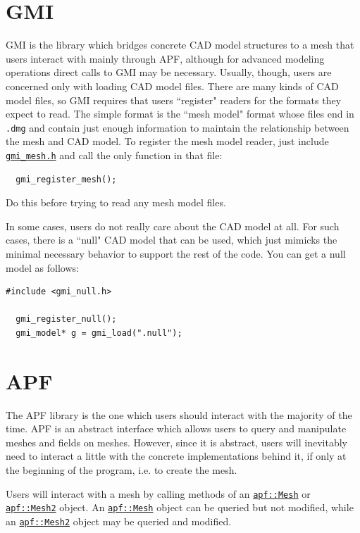 \documentclass{article}
\begin{document}
\section{GMI}
\label{sec:gmi}

GMI is the library which bridges concrete CAD model structures
to a mesh that users interact with mainly through APF, although
for advanced modeling operations direct calls to GMI may be necessary.
Usually, though, users are concerned only with loading CAD model
files.
There are many kinds of CAD model files, so GMI requires that users
``register" readers for the formats they expect to read.
The simple format is the ``mesh model" format whose files end in
\texttt{.dmg} and contain just enough information to maintain
the relationship between the mesh and CAD model.
To register the mesh model reader, just include
\href{https://github.com/SCOREC/core/blob/master/gmi/gmi_mesh.h}{\texttt{gmi\_mesh.h}}
and call the only function in that file:

\begin{lstlisting}
  gmi_register_mesh();
\end{lstlisting}

Do this before trying to read any mesh model files.

In some cases, users do not really care about the CAD model at
all.
For such cases, there is a ``null" CAD model that can be used,
which just mimicks the minimal necessary behavior to support
the rest of the code.
You can get a null model as follows:

\begin{lstlisting}
#include <gmi_null.h>

  gmi_register_null();
  gmi_model* g = gmi_load(".null");
\end{lstlisting}

\section{APF}

The APF library is the one which users should interact with the
majority of the time.
APF is an abstract interface which allows users to query and manipulate
meshes and fields on meshes.
However, since it is abstract, users will inevitably need to
interact a little with the concrete implementations behind it,
if only at the beginning of the program, i.e. to create the mesh.

Users will interact with a mesh by calling methods of an
\href{http://scorec.rpi.edu/~dibanez/core/classapf_1_1Mesh.html}{\texttt{apf::Mesh}}
or
\href{http://scorec.rpi.edu/~dibanez/core/classapf_1_1Mesh2.html}{\texttt{apf::Mesh2}}
object.
An
\href{http://scorec.rpi.edu/~dibanez/core/classapf_1_1Mesh.html}{\texttt{apf::Mesh}}
object can be queried but not modified, while an
\href{http://scorec.rpi.edu/~dibanez/core/classapf_1_1Mesh2.html}{\texttt{apf::Mesh2}}
object may be queried and modified.
\end{document}
